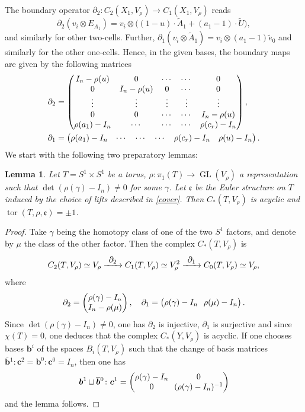 \documentclass[10pt]{amsart}
\newcommand\To[1]{\mathchoice{\xrightarrow{\textstyle\kern4pt#1\kern3pt}}{\stackrel{#1}{\longrightarrow}}{}{}}
\theoremstyle{plain}
\newtheorem{lem}[thm]{Lemma}
\theoremstyle{definition}
\theoremstyle{remark}
\DeclareMathOperator{\GL}{GL}
\numberwithin{equation}{section}
\DeclareMathOperator{\tor}{tor}
\begin{document}
The boundary operator $\partial_2 \colon C_2(X_1, V_\rho) \to C_1(X_1, V_\rho)$ reads
\[
\partial_2(v_i \otimes E_{A_1}) = v_i \otimes \bigl((1-u) \cdot \widetilde A_1 + (a_1 - 1) \cdot \widetilde U\bigr),
\]
and similarly for other two-cells.
Further, $\partial_1(v_i \otimes \widetilde A_1) = v_i \otimes (a_1 - 1) \widetilde e_0$ and similarly for the other one-cells. Hence, in the given bases, the boundary maps are given by the following matrices
\begin{align*}
\arraycolsep4.5pt
\partial_2 &= \begin{pmatrix}
I_n - \rho(u) & 0 & \cdots & \cdots & 0\\
0 & I_n - \rho(u) &0 & \cdots & 0\\
\vdots & \vdots & \vdots & \vdots & \vdots\\
0 & 0 & \cdots & \cdots & I_n - \rho(u)\\
\rho(a_1) - I_n & \cdots & \cdots & \cdots & \rho(c_r)-I_n
\end{pmatrix},\\
\partial_1 &= \begin{pmatrix} \rho(a_1) - I_n & \cdots & \cdots & \cdots & \rho(c_r)-I_n & \rho(u)-I_n \end{pmatrix}.
\end{align*}
We start with the following two preparatory lemmas:
\begin{lem}
\label{lem:bound}
Let $T = S^1\times S^1$ be a torus, $\rho \colon \pi_1(T) \to \GL(V_\rho)$ a representation such that $\det(\rho (\gamma) -I_n) \neq 0$ for some $\gamma$. Let $\mathfrak e$ be the Euler structure on $T$ induced by the choice of lifts described in \cref{cover}. Then $C_*(T, V_\rho)$ is acyclic and $\tor(T, \rho, \mathfrak e) = \pm 1$.
\end{lem}
\begin{proof}
Take $\gamma$ being the homotopy class of one of the two $S^1$ factors, and denote by $\mu$ the class of the other factor. Then the complex $C_*(T,V_\rho)$ is
\[
C_2(T, V_\rho) \simeq V_\rho \To{\partial_2} C_1(T, V_\rho) \simeq V_\rho^2 \To{\partial_1} C_0(T, V_\rho) \simeq V_\rho,
\]
where
\[\arraycolsep3.5pt
\partial_2 = \begin{pmatrix} \rho(\gamma) - I_n\\ I_n - \rho(\mu) \end{pmatrix}, \quad \partial_1 = \begin{pmatrix} \rho(\gamma) - I_n & \rho(\mu)- I_n \end{pmatrix}.
\]
Since $\det (\rho(\gamma)-I_n) \neq 0$, one has $\partial_2$ is injective, $\partial_1$ is surjective and since $\chi(T)=0$, one deduces that the complex $C_*(Y, V_\rho)$ is acyclic. If one chooses bases $\boldsymbol b^i$ of the spaces $B_i(T, V_\rho)$ such that the change of basis matrices $\boldsymbol{\overline b}{}^1 \colon \boldsymbol c^2 = \boldsymbol{ b}^0 \colon \boldsymbol c^0 = I_n$, then one has
\[\arraycolsep3.5pt
\boldsymbol b^1 \sqcup \boldsymbol{\overline b}{}^0 \colon \boldsymbol c^1 = \begin{pmatrix} \rho(\gamma)-I_n & 0 \\ 0 & (\rho(\gamma)-I_n)^{-1} \end{pmatrix}
\]
and the lemma follows.
\end{proof}
\end{document}
